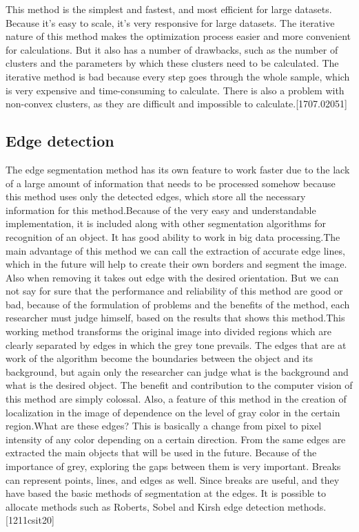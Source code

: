 \par This method is the simplest and fastest, and most efficient for large datasets. Because it's easy to scale, it's very responsive for large datasets. The iterative nature of this method makes the optimization process easier and more convenient for calculations. But it also has a number of drawbacks, such as the number of clusters and the parameters by which these clusters need to be calculated. The iterative method is bad because every step goes through the whole sample, which is very expensive and time-consuming to calculate. There is also a problem with non-convex clusters, as they are difficult and impossible to calculate.[1707.02051]

\subsection{Edge detection}\label{sec:3.4.3}
\par  The edge segmentation method has its own feature to work faster due to the lack of a large amount of information that needs to be processed somehow because this method uses only the detected edges, which store all the necessary information for this method.Because of the very easy and understandable implementation, it is included along with other segmentation algorithms for recognition of an object. It has good ability to work in big data processing.The main advantage of this method we can call the extraction of accurate edge lines, which in the future will help to create their own borders and segment the image. Also when removing it takes out edge with the desired orientation. But we can not say for sure that the performance and reliability of this method are good or bad, because of the formulation of problems and the benefits of the method, each researcher must judge himself, based on the results that shows this method.This working method transforms the original image into divided regions which are clearly separated by edges in which the grey tone prevails. The edges that are at work of the algorithm become the boundaries between the object and its background, but again only the researcher can judge what is the background and what is the desired object. The benefit and contribution to the computer vision of this method are simply colossal. Also, a feature of this method in the creation of localization in the image of dependence on the level of gray color in the certain region.What are these edges? This is basically a change from pixel to pixel intensity of any color depending on a certain direction. From the same edges are extracted the main objects that will be used in the future. Because of the importance of grey, exploring the gaps between them is very important. Breaks can represent points, lines, and edges as well. Since breaks are useful, and they have based the basic methods of segmentation at the edges. It is possible to allocate methods such as Roberts, Sobel and Kirsh edge detection methods.[1211csit20]


